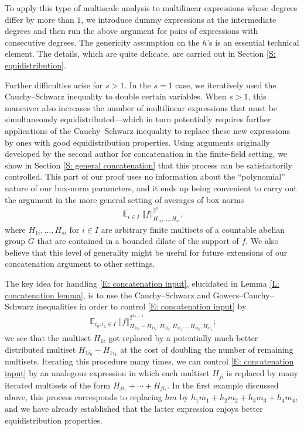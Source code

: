 \documentclass[11pt]{amsart}
\theoremstyle{definition}
\DeclareMathOperator*{\E}{\mathbb{E}}
\newcommand{\norm}[1]{\left\Vert #1\right\Vert}
\begin{document}
To apply this type of multiscale analysis to multilinear expressions whose degrees differ by more than $1$, we introduce dummy expressions at the intermediate degrees and then run the above argument for pairs of expressions with consecutive degrees.  The genericity assumption on the $h$'s is an essential technical element.  The details, which are quite delicate, are carried out in Section \ref{S: equidistribution}.

Further difficulties arise for $s>1$.  In the $s=1$ case, we iteratively used the Cauchy--Schwarz inequality to double certain variables.  When $s>1$, this maneuver also increases the number of multilinear expressions that must be simultaneously equidistributed---which in turn potentially requires further applications of the Cauchy--Schwarz inequality to replace these new expressions by ones with good equidistribution properties.  Using arguments originally developed by the second author \cite{Kuc23} for concatenation in the finite-field setting, we show in Section \ref{S: general concatenation} that this process can be satisfactorily controlled.  This part of our proof uses no information about the ``polynomial'' nature of our box-norm parameters, and it ends up being convenient to carry out the argument in the more general setting of averages of box norms
\begin{align}\label{E: concatenation input}
    \E_{i\in I}\norm{f}_{H_{1i}, \ldots, H_{si}}^{2^s},
\end{align}
where $H_{1i}, \ldots, H_{si}$ for $i \in I$ are arbitrary finite multisets of a countable abelian group $G$ that are contained in a bounded dilate of the support of $f$.  We also believe that this level of generality might be useful for future extensions of our concatenation argument to other settings. 

The key idea for handling \eqref{E: concatenation input}, elucidated in Lemma \ref{L: concatenation lemma}, is to use the Cauchy--Schwarz and Gowers--Cauchy--Schwarz inequalities in order to control \eqref{E: concatenation input} by
\begin{align*}
    \E_{i_0, i_1\in I}\norm{f}_{H_{1i_0}-H_{1i_1}, H_{2i_0}, H_{2i_1} \ldots, H_{si_0}, H_{si_1}}^{2^{2s-1}};
\end{align*}
we see that the multiset $H_{1i}$ got replaced by a potentially much better distributed multiset $H_{1i_0}-H_{1i_1}$ at the cost of doubling the number of remaining multisets. Iterating this procedure many times, we can control \eqref{E: concatenation input} by an analogous expression in which each multiset $H_{ji}$ is replaced by many iterated multisets of the form $H_{ji_1} + \cdots + H_{ji_\ell}$. In the first example discussed above, this process corresponds to replacing $hm$ by $h_1m_1+h_2m_2+h_3m_3+h_4m_4$, and we have already established that the latter expression enjoys better equidistribution properties.
\end{document}
